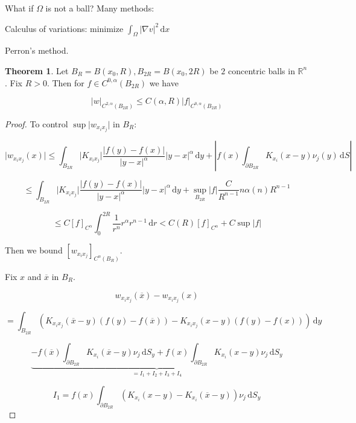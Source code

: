 \documentclass{article}
\theoremstyle{definition}
\newtheorem{theorem}{Theorem}
\begin{document}
What if \(\Omega\) is not a ball? Many methods:

Calculus of variations: minimize \(\int_{\Omega} \vert \nabla v \vert ^2 \,\mathrm{d}x \) 

Perron's method.

\begin{theorem}
    Let \(B_R = B(x_0, R), B_{2R} = B(x_0, 2R)\) be \(2\) concentric balls in \(\mathbb{R}^n\). Fix \(R>0\). Then for \(f\in C^{0,\alpha}(B_{2R})\) we have

    \[
        \vert w \vert _{C^{2,\alpha}(B_{2R})} \leq C(\alpha, R) \vert f \vert _{C^{0,\alpha}(B_{2R})}
    \]
\end{theorem}

\begin{proof}
    To control \(\sup \vert w_{x_i x_j} \vert\) in \(B_R\):

    \[
        \vert w_{x_i x_j} (x) \vert \leq \int_{B_{2R}} \vert K_{x_i x_j} \vert \frac{\vert f(y) - f(x) \vert}{\vert y - x \vert ^ \alpha} \vert y - x \vert ^ \alpha \,\mathrm{d}y + \left\vert f(x) \int_{\partial B_{2R}}  K_{x_i} (x-y) \nu_j (y) \,\mathrm{d}S \right\vert 
    \]

    \[
        \leq \int_{B_{2R}} \vert K_{x_i x_j} \vert \frac{\vert f(y) - f(x) \vert}{\vert y - x \vert ^ \alpha} \vert y - x \vert ^ \alpha \,\mathrm{d}y + \sup_{B_{2R}} \vert f \vert \frac{C}{R^{n-1}} n \alpha (n) R^{n-1}
    \]

    \[
        \leq C[f]_{C^\alpha} \int_{0}^{2R} \frac{1}{r^n} r^\alpha r^{n-1} \,\mathrm{d}r < C(R) [f]_{C^\alpha} + C \sup \vert f \vert
    \]

    Then we bound \([w_{x_i x_j}]_{C^\alpha (B_R)}\).
    
    Fix \(x\) and \(\overline{x}\) in \(B_R\).

    \[
        w_{x_i x_j} (\overline{x}) - w_{x_i x_j} (x)
    \]
        
    \[
        = \int_{B_{2R}} \left( K_{x_i x_j} (\overline{x} - y) (f(y) - f(\overline{x})) - K_{x_i x_j} (x-y) (f(y) - f(x)) \right)  \,\mathrm{d}y 
    \]

    \[
        \underbrace{- f(\overline{x}) \int_{\partial B_{2R}} K_{x_i} (\overline{x} - y) \nu_j \,\mathrm{d}S_y + f(x) \int_{\partial B_{2R}} K_{x_i} (x-y) \nu_j \,\mathrm{d}S_y}_{=I_1 + I_2 + I_3 + I_4} 
    \]

    \[
        I_1 = f(x) \int_{\partial B_{2R}} \left( K_{x_i} (x-y) - K_{x_i} (\overline{x} - y) \right) \nu_j \,\mathrm{d}S_y
    \]
        

\end{proof}
\end{document}
